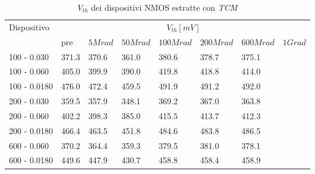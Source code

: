 \documentclass[12pt, letterpaper]{book}
\begin{document}
\begin{table}[H]
  \renewcommand{\arraystretch}{1.3}
  \begin{tabular}{m{2.1cm} m{0.8cm} m{1.1cm} m{1.3cm} m{1.5cm} m{1.5cm} m{1.5cm} m{1cm}}
    \toprule
    \multirow{2}{*}{Dispositivo} & \multicolumn{7}{c}{$V_{th} [mV] $}                                                                    \\
    \cmidrule{2-8}
                                 & pre                                & $5Mrad$ & $50Mrad$ & $100Mrad$ & $200Mrad$ & $600Mrad$ & $1Grad$ \\
    \midrule
    100 - 0.030                     & 371.3                              & 370.6   & 361.0    & 380.6     & 378.7     & 375.1     &         \\
    \hline
    100 - 0.060                     & 405.0                              & 399.9   & 390.0    & 419.8     & 418.8     & 414.0     &         \\
    \hline
    100 - 0.0180                    & 476.0                              & 472.4   & 459.5    & 491.9     & 491.2     & 492.0     &         \\
    \hline
    200 - 0.030                     & 359.5                              & 357.9   & 348.1    & 369.2     & 367.0     & 363.8     &         \\
    \hline
    200 - 0.060                     & 402.2                              & 398.3   & 385.0    & 415.5     & 413.7     & 412.3     &         \\
    \hline
    200 - 0.0180                    & 466.4                              & 463.5   & 451.8    & 484.6     & 483.8     & 486.5     &         \\
    \hline
    600 - 0.060                     & 370.2                              & 364.4   & 359.3    & 379.5     & 381.0     & 378.1     &         \\
    \hline
    600 - 0.0180                    & 449.6                              & 447.9   & 430.7    & 458.8     & 458.4     & 458.9     &         \\
    \bottomrule
  \end{tabular}
  \caption{$V_{th}$ dei dispositivi NMOS estratte con \emph{TCM}}
  \label{tab:VthTCMN}
\end{table}
\end{document}
